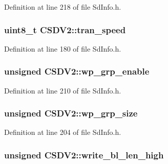 Definition at line 218 of file Sd\+Info.\+h.

\subsubsection[{\texorpdfstring{tran\+\_\+speed}{tran\_speed}}]{\setlength{\rightskip}{0pt plus 5cm}uint8\+\_\+t C\+S\+D\+V2\+::tran\+\_\+speed}\hypertarget{struct_c_s_d_v2_a4321f8cba41dcefe65e4d8357b93a705}{}\label{struct_c_s_d_v2_a4321f8cba41dcefe65e4d8357b93a705}


Definition at line 180 of file Sd\+Info.\+h.

\subsubsection[{\texorpdfstring{wp\+\_\+grp\+\_\+enable}{wp\_grp\_enable}}]{\setlength{\rightskip}{0pt plus 5cm}unsigned C\+S\+D\+V2\+::wp\+\_\+grp\+\_\+enable}\hypertarget{struct_c_s_d_v2_a17bbbfe5a1d0da01eeb9dc0e78d1fccc}{}\label{struct_c_s_d_v2_a17bbbfe5a1d0da01eeb9dc0e78d1fccc}


Definition at line 210 of file Sd\+Info.\+h.

\subsubsection[{\texorpdfstring{wp\+\_\+grp\+\_\+size}{wp\_grp\_size}}]{\setlength{\rightskip}{0pt plus 5cm}unsigned C\+S\+D\+V2\+::wp\+\_\+grp\+\_\+size}\hypertarget{struct_c_s_d_v2_afc375bf41f2bffcea61b4a26e95a259a}{}\label{struct_c_s_d_v2_afc375bf41f2bffcea61b4a26e95a259a}


Definition at line 204 of file Sd\+Info.\+h.

\subsubsection[{\texorpdfstring{write\+\_\+bl\+\_\+len\+\_\+high}{write\_bl\_len\_high}}]{\setlength{\rightskip}{0pt plus 5cm}unsigned C\+S\+D\+V2\+::write\+\_\+bl\+\_\+len\+\_\+high}\hypertarget{struct_c_s_d_v2_aa2b4a19a9ee6671b3441636868d2559e}{}\label{struct_c_s_d_v2_aa2b4a19a9ee6671b3441636868d2559e}


